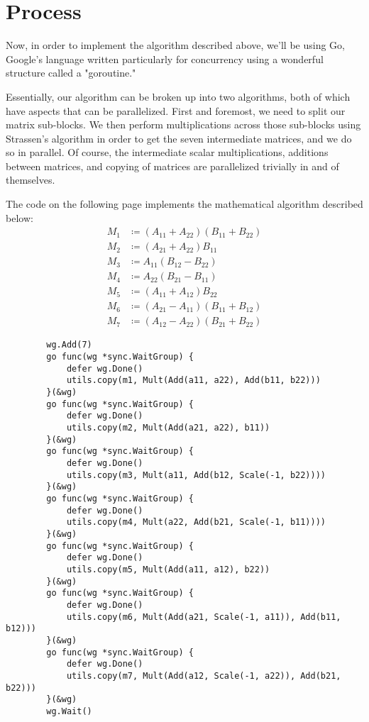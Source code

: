 \documentclass[12pt, letterpaper]{article}
\theoremstyle{remark}
\theoremstyle{remark}
\begin{document}
    \pagebreak

    \section{Process}

    Now, in order to implement the algorithm described above, we'll be using Go, Google's
    language written particularly for concurrency using a wonderful structure called a "goroutine."

    Essentially, our algorithm can be broken up into two algorithms, both of which have aspects that can be 
    parallelized. First and foremost, we need to split our matrix sub-blocks. We then perform 
    multiplications across those sub-blocks using Strassen's algorithm in order to get the seven intermediate matrices, 
    and we do so in parallel. Of course, the intermediate scalar multiplications, additions between matrices, and copying of 
    matrices are parallelized trivially in and of themselves.

    The code on the following page implements the mathematical algorithm described below:
    \begin{align*}
        M_1 &\coloneqq (A_{11} + A_{22})(B_{11} + B_{22}) \\
        M_2 &\coloneqq (A_{21} + A_{22})B_{11} \\
        M_3 &\coloneqq A_{11}(B_{12} - B_{22}) \\
        M_4 &\coloneqq A_{22}(B_{21} - B_{11}) \\
        M_5 &\coloneqq (A_{11} + A_{12})B_{22} \\
        M_6 &\coloneqq (A_{21} - A_{11})(B_{11} + B_{12}) \\
        M_7 &\coloneqq (A_{12} - A_{22})(B_{21} + B_{22})
    \end{align*}
    \pagebreak
    \begin{verbatim}
        wg.Add(7)
        go func(wg *sync.WaitGroup) {
            defer wg.Done()
            utils.copy(m1, Mult(Add(a11, a22), Add(b11, b22)))
        }(&wg)
        go func(wg *sync.WaitGroup) {
            defer wg.Done()
            utils.copy(m2, Mult(Add(a21, a22), b11))
        }(&wg)
        go func(wg *sync.WaitGroup) {
            defer wg.Done()
            utils.copy(m3, Mult(a11, Add(b12, Scale(-1, b22))))
        }(&wg)
        go func(wg *sync.WaitGroup) {
            defer wg.Done()
            utils.copy(m4, Mult(a22, Add(b21, Scale(-1, b11))))
        }(&wg)
        go func(wg *sync.WaitGroup) {
            defer wg.Done()
            utils.copy(m5, Mult(Add(a11, a12), b22))
        }(&wg)
        go func(wg *sync.WaitGroup) {
            defer wg.Done()
            utils.copy(m6, Mult(Add(a21, Scale(-1, a11)), Add(b11, b12)))
        }(&wg)
        go func(wg *sync.WaitGroup) {
            defer wg.Done()
            utils.copy(m7, Mult(Add(a12, Scale(-1, a22)), Add(b21, b22)))
        }(&wg)
        wg.Wait()
    \end{verbatim}
\end{document}
